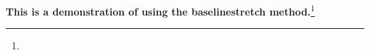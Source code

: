 \documentclass{article}%
\begin{document}

        \textbf{This is a demonstration of using the baselinestretch method.}\footnote{\blindtext} \\

        \blindtext
\end{document}
